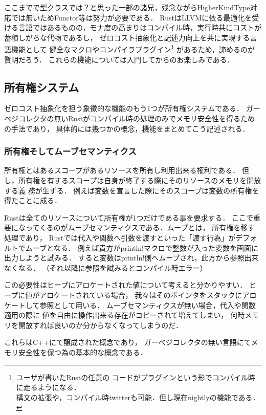 ここまでで型クラスでは？と思った一部の諸兄，残念ながらHigherKindType対応では無いためFunctor等は努力が必要である．
RustはLLVMに依る最適化を受ける言語ではあるものの，モナ度の高まりはコンパイル時，実行時共にコストが蓄積しがちな代物であるし，
ゼロコスト抽象化と記述力向上を共に実現する言語機能として
健全なマクロやコンパイラプラグイン\footnote{ユーザが書いたRustの任意の
  コードがプラグインという形でコンパイル時に走るようになる． \\
  構文の拡張や，コンパイル時twitterも可能．但し現在nightlyの機能である．}
があるため，諦めるのが賢明だろう．
これらの機能については入門してからのお楽しみである．

\subsection{所有権システム}
ゼロコスト抽象化を担う象徴的な機能のもう1つが所有権システムである．
ガーベジコレクタの無いRustがコンパイル時の処理のみでメモリ安全性を得るための手法であり，
具体的には幾つかの概念，機能をまとめてこう記述される．

\subsubsection{所有権そしてムーブセマンティクス}
所有権とはあるスコープがあるリソースを所有し利用出来る権利である．
但し，所有権を有するスコープは自身が終了する際にそのリソースのメモリを開放する義
務が生ずる．
例えば変数を宣言した際にそのスコープは変数の所有権を得たことに成る．

Rustは全てのリソースについて所有権が1つだけである事を要求する．
ここで重要になってくるのがムーブセマンティクスである．ムーブとは，
所有権を移す処理であり，
Rustでは代入や関数へ引数を渡すといった「渡す行為」がデフォルトでムーブとなる．
例えば貴方がprintln!マクロで整数が入った変数を画面に出力しようと試みる．
すると変数はprintln!側へムーブされ，此方から参照出来なくなる．
（それ以降に参照を試みるとコンパイル時エラー）

この必要性はヒープにアロケートされた値について考えると分かりやすい．
ヒープに値がアロケートされている場合，
我々はそのポインタをスタックにアロケートして参照として用いる．
ムーブセマンティクスが無い場合，代入や関数適用の際に
値を自由に操作出来る存在がコピーされて増えてしまい，
何時メモリを開放すれば良いのか分からなくなってしまうのだ．

これらはC++にて醸成された概念であり，
ガーベジコレクタの無い言語にてメモリ安全性を保つ為の基本的な概念である．

